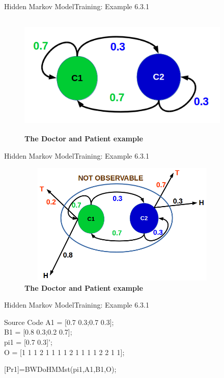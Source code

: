 \documentclass[10pt]{beamer}
\begin{document}
\begin{frame}{Hidden Markov Model}{Training: Example 6.3.1}
  \begin{figure}[h]
    \centering
    \includegraphics[width=4in,height=2.3in]{figures/toss_coin_example_02.png}
    \caption {\textbf{The Doctor and Patient example}}
  \end{figure}
\end{frame}

\begin{frame}{Hidden Markov Model}{Training: Example 6.3.1}
  \begin{figure}[h]
    \centering
    \includegraphics[width=4in,height=2.3in]{figures/toss_coin_example_03.png}
    \caption {\textbf{The Doctor and Patient example}}
  \end{figure}
\end{frame}

\begin{frame}{Hidden Markov Model}{Training: Example 6.3.1}
    \begin{block}{Source Code}
        A1 = [0.7 0.3;0.7 0.3];\\
        B1 = [0.8 0.3;0.2 0.7];\\
        pi1 = [0.7 0.3]';\\
         
        O = [1 1 1 2 1 1 1 1 2 1 1 1 1 2 2 1 1];
        
        [Pr1]=BWDoHMMst(pi1,A1,B1,O);
    \end{block}
\end{frame}
\end{document}
